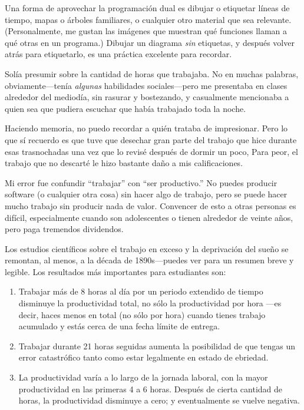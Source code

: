 Una forma de aprovechar la programación dual es dibujar o etiquetar líneas de tiempo,
mapas o árboles familiares,
o cualquier otro material que sea relevante.
(Personalmente, me gustan las imágenes que muestran qué funciones llaman a qué otras en un programa.)
Dibujar un diagrama \emph{sin} etiquetas,
y después volver atrás para etiquetarlo,
es una práctica excelente para recordar.


Solía presumir sobre la cantidad de horas que trabajaba.
No en muchas palabras,
obviamente---tenía \emph{algunas} habilidades sociales---pero
me presentaba en clases alrededor del mediodía,
sin rasurar y bostezando,
y casualmente mencionaba a quien sea que pudiera escuchar
que había trabajado toda la noche.

Haciendo memoria,
no puedo recordar a quién trataba de impresionar.
Pero lo que sí recuerdo es
que tuve que desechar gran parte del trabajo que hice durante esas trasnochadas
una vez que lo revisé después de dormir un poco,
Para peor, el trabajo que no descarté le hizo bastante daño a mis calificaciones.

Mi error fue confundir ``trabajar'' con ``ser productivo.''
No puedes producir software (o cualquier otra cosa) sin hacer algo de trabajo,
pero se puede hacer mucho trabajo sin producir nada de valor.
Convencer de esto a otras personas es difícil,
especialmente cuando son adolescentes o tienen alrededor de veinte años,
pero paga tremendos dividendos.

Los estudios científicos sobre el trabajo en exceso y la deprivación del sueño se remontan, al menos, a la década de 1890s---puedes ver
\cite{Robi2005} para un resumen breve y legible.
Los resultados más importantes para estudiantes son:

\begin{enumerate}

\item
  Trabajar más de 8 horas al día por un periodo extendido de tiempo
  disminuye la productividad total,
  no sólo la productividad por hora ---es decir, haces menos en total (no sólo por hora)
  cuando tienes trabajo acumulado y estás cerca de una fecha límite de entrega.

\item
  Trabajar durante 21 horas seguidas aumenta la posibilidad de que tengas un error catastrófico
  tanto como estar legalmente en estado de ebriedad.

\item
  La productividad varía a lo largo de la jornada laboral,
  con la mayor productividad en las primeras 4 a 6 horas.
  Después de cierta cantidad de horas,
  la productividad disminuye a cero;
  y eventualmente se vuelve negativa.

\end{enumerate}

